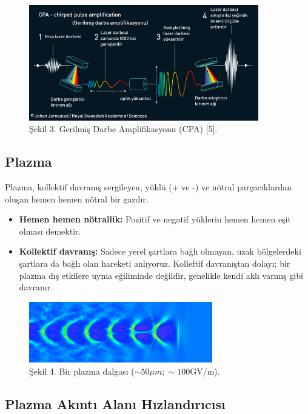 \documentclass{article}
\begin{document}
 \begin{figure}[h]
 \centering
\includegraphics[width=10cm]{CPA-tr2-696x351.png}
\caption*{Şekil 3. Gerilmiş Darbe Amplifikasyonu (CPA) [5].}
	\end{figure}
	
\subsection{Plazma}

Plazma, kollektif davranış sergileyen, yüklü (+ ve -) ve nötral parçacıklardan oluşan hemen hemen nötral bir gazdır.

\begin{itemize}
    \item \textbf{Hemen hemen nötrallik:} Pozitif ve negatif yüklerin hemen hemen eşit olması demektir.
    \item \textbf{Kollektif davranış: } Sadece yerel şartlara bağlı olmayan, uzak bölgelerdeki şartlara da bağlı olan hareketi anlıyoruz. Kolleftif davranıştan dolayı; bir plazma dış etkilere uyma eğiliminde değildir, genelikle kendi aklı varmış gibi davranır.
\end{itemize}

 \begin{figure}[h]
 \centering
\includegraphics[width=8cm]{plasma_wave.png}
\caption*{Şekil 4. Bir plazma dalgası ($ \sim 50 \mu m;  \sim 100 \textrm{GV/m}$).}
	\end{figure}
 
 
 \subsection{Plazma Akıntı Alanı Hızlandırıcısı}
 
\end{document}
